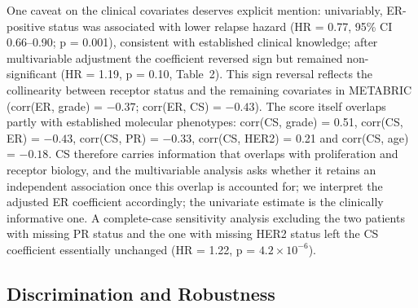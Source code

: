 \documentclass[12pt]{article}
\begin{document}
One caveat on the clinical covariates deserves explicit mention: univariably,
ER-positive status was associated with lower relapse hazard (HR = 0.77, 95\%
CI 0.66--0.90; p = 0.001), consistent with established clinical knowledge;
after multivariable adjustment the coefficient reversed sign but remained
non-significant (HR = 1.19, p = 0.10, Table~2). This sign reversal reflects
the collinearity between receptor status and the remaining covariates in
METABRIC (corr(ER, grade) = $-0.37$; corr(ER, CS) = $-0.43$). The score
itself overlaps partly with established molecular phenotypes: corr(CS,
grade) = 0.51, corr(CS, ER) = $-0.43$, corr(CS, PR) = $-0.33$, corr(CS,
HER2) = 0.21 and corr(CS, age) = $-0.18$. CS therefore carries information
that overlaps with proliferation and receptor biology, and the multivariable
analysis asks whether it retains an independent association once this
overlap is accounted for; we interpret the adjusted ER coefficient
accordingly; the
univariate estimate is the clinically informative one. A complete-case
sensitivity analysis excluding the two patients with missing PR status and
the one with missing HER2 status left the CS coefficient essentially
unchanged (HR = 1.22, p = $4.2\times10^{-6}$).

\subsection{Discrimination and Robustness}
\end{document}
